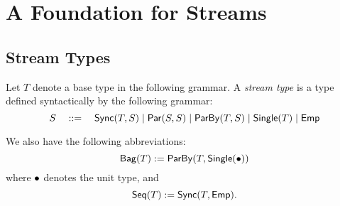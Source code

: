 \clearpage

\section{A Foundation for Streams}
\label{sec:foundation}


\cite{StreamQRE}

\subsection{Stream Types}


\begin{definition}
Let $T$ denote a base type in the following grammar.
A \emph{stream type} is a type defined syntactically by the following grammar:
\[
  S \quad ::= \quad
    \mathsf{Sync}({T}, S) \mid
    \mathsf{Par}({S}, {S}) \mid
    \mathsf{ParBy}({T}, S) \mid
    \mathsf{Single}(T) \mid
    \mathsf{Emp}{}
\]
\end{definition}

We also have the following abbreviations:
\[
  \mathsf{Bag}({T}) := \mathsf{ParBy}({T}, \mathsf{Single}(\bullet{}))
\]
where $\bullet{}$ denotes the unit type, and
\[
  \mathsf{Seq}({T}) := \mathsf{Sync}({T}, \mathsf{Emp}{}).
\]

